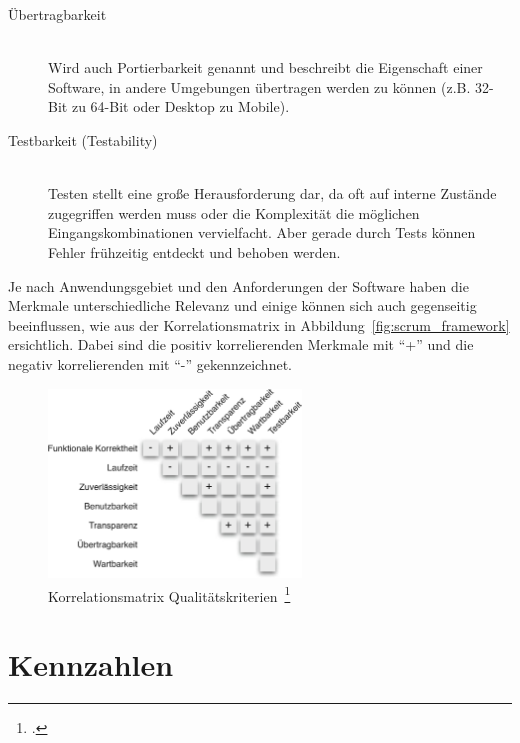 \begin{description}
\begin{description}
    \item[Übertragbarkeit] \hfill \\ Wird auch Portierbarkeit genannt und beschreibt die Eigenschaft einer Software, in andere Umgebungen übertragen werden zu können (z.B. 32-Bit zu 64-Bit oder Desktop zu Mobile).
    \item[Testbarkeit (Testability)] \hfill \\ Testen stellt eine große Herausforderung dar, da oft auf interne Zustände zugegriffen werden muss oder die Komplexität die möglichen Eingangskombinationen vervielfacht. Aber gerade durch Tests können Fehler frühzeitig entdeckt und behoben werden.
  \end{description}
\end{description}

Je nach Anwendungsgebiet und den Anforderungen der Software haben die Merkmale unterschiedliche Relevanz und einige können sich auch gegenseitig beeinflussen, wie aus der Korrelationsmatrix in Abbildung~\ref{fig:scrum_framework} ersichtlich.
Dabei sind die positiv korrelierenden Merkmale mit ``+'' und die negativ korrelierenden mit ``-'' gekennzeichnet.

\begin{savenotes}
  \begin{figure}[H] 
    \centering
       \includegraphics[width=0.6\textwidth]{img/korrelationsmatrix-kriterien.png}
    \caption[Korrelationsmatrix Qualitätskriterien]{Korrelationsmatrix Qualitätskriterien~\footcite[][S. 11, Abb. 1.3]{hoffmann_software_qualitat_2013}}\label{fig:Korrelationsmatrix Qualitätskriterien}
  \end{figure}
\end{savenotes}

\newpage
\section{Kennzahlen}

